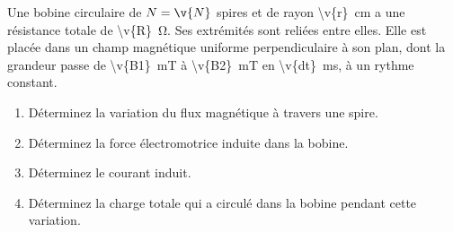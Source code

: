Une bobine circulaire de $N = \v{N}$ spires et de rayon \qty{\v{r}}{cm} a une résistance totale de \qty{\v{R}}{\ohm}. Ses extrémités sont reliées entre elles. Elle est placée dans un champ magnétique uniforme perpendiculaire à son plan, dont la grandeur passe de \qty{\v{B1}}{mT} à \qty{\v{B2}}{mT} en \qty{\v{dt}}{ms}, à un rythme constant.

\begin{enumerate}[label=\alph*)]
    \item Déterminez la variation du flux magnétique à travers une spire.
    \item Déterminez la force électromotrice induite dans la bobine.
    \item Déterminez le courant induit.
    \item Déterminez la charge totale qui a circulé dans la bobine pendant cette variation.
\end{enumerate}

